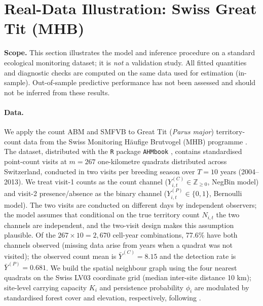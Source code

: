 \documentclass[review,12pt]{elsarticle}
\theoremstyle{definition}
\begin{document}
\section{Real-Data Illustration: Swiss Great Tit (MHB)}
\label{sec:realdata}

\textbf{Scope.} This section illustrates the model and inference procedure
on a standard ecological monitoring dataset; it is \emph{not} a validation
study.  All fitted quantities and diagnostic checks are computed on the same
data used for estimation (in-sample).  Out-of-sample predictive performance
has not been assessed and should not be inferred from these results.

\paragraph{Data.}
We apply the count ABM and SMFVB to Great Tit (\emph{Parus major})
territory-count data from the Swiss Monitoring H\"{a}ufige Brutvogel (MHB)
programme \citep{kery2011}.  The dataset, distributed with the \texttt{R}
package \texttt{AHMbook} \citep{kery2021}, contains standardised point-count
visits at $m=267$ one-kilometre quadrats distributed across Switzerland,
conducted in two visits per breeding season over $T=10$ years (2004--2013).
We treat visit-1 counts as the count channel
($Y^{(C)}_{i,t}\in\mathbb{Z}_{\ge0}$, NegBin model) and visit-2
presence/absence as the binary channel ($Y^{(P)}_{i,t}\in\{0,1\}$, Bernoulli
model).  The two visits are conducted on different days by independent observers; the
model assumes that conditional on the true territory count $N_{i,t}$ the two
channels are independent, and the two-visit design makes this assumption
plausible.
Of the $267\times10=2{,}670$ cell-year combinations, 77.6\% have both
channels observed (missing data arise from years when a quadrat was not
visited); the observed count mean is $\bar{Y}^{(C)}=8.15$ and the
detection rate is $\bar{Y}^{(P)}=0.681$.  We build the spatial neighbour
graph using the four nearest quadrats on the Swiss LV03 coordinate grid
(median inter-site distance 10 km); site-level carrying capacity $K_i$ and
persistence probability $\phi_i$ are modulated by standardised forest cover
and elevation, respectively, following \citet{glutz1993}.
\end{document}
